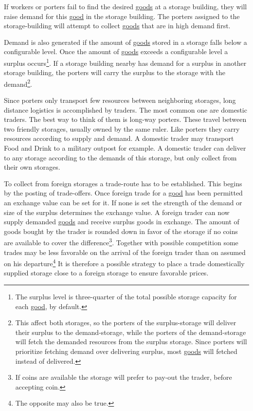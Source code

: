 If workers or porters fail to find the desired \hyperref[ch:Goods]{goods} at a
storage building, they will raise demand for this \hyperref[ch:Goods]{good} in
the storage building. The porters assigned to the storage-building will attempt
to collect \hyperref[ch:Goods]{goods} that are in high demand first.

Demand is also generated if the amount of \hyperref[ch:Goods]{goods} stored in
a storage falls below a configurable level. Once the amount of
\hyperref[ch:Goods]{goods} exceeds a configurable level a surplus
occurs\footnote{ The surplus level is three-quarter of the total possible
	storage capacity for each \hyperref[ch;ch:Goods]{good}, by default. }. If a
storage building nearby has demand for a surplus in another storage building,
the porters will carry the surplus to the storage with the demand\footnote{
	This affect both storages, so the porters of the surplus-storage will deliver
	their surplus to the demand-storage, while the porters of the demand-storage
	will fetch the demanded resources from the surplus storage. Since porters will
	prioritize fetching demand over delivering surplus, most
	\hyperref[ch:Goods]{goods} will fetched instead of delivered.}.

Since porters only transport few resources between neighboring storages, long
distance logistics is accomplished by traders. The most common one are domestic
traders. The best way to think of them is long-way porters. These travel
between two friendly storages, usually owned by the same ruler. Like porters
they carry resources according to supply and demand. A domestic trader may
transport \gls{Food} and \gls{Drink} to a military outpost for example. A
domestic trader can deliver to any storage according to the demands of this
storage, but only collect from their own storages.

To collect from foreign storages a trade-route has to be established. This
begins by the posting of trade-offers. Once foreign trade for a
\hyperref[ch:Goods]{good} has been permitted an exchange value can be set for
it. If none is set the strength of the demand or size of the surplus determines
the exchange value. A foreign trader can now supply demanded
\hyperref[ch:Goods]{goods} and receive surplus goods in exchange. The amount of
goods bought by the trader is rounded down in favor of the storage if no coins
are available to cover the difference\footnote{ If coins are available the
	storage will prefer to pay-out the trader, before accepting coin. }. Together
with possible competition some trades may be less favorable on the arrival of
the foreign trader than on assumed on his departure\footnote{ The opposite may
	also be true.} It is therefore a possible strategy to place a trade
domestically supplied storage close to a foreign storage to ensure favorable
prices.

